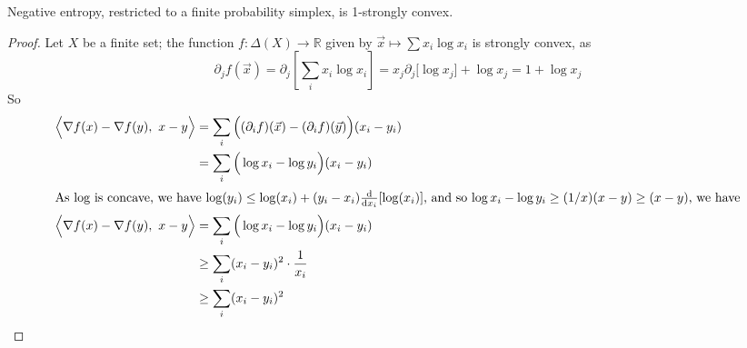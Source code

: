 {%
\begin{prop}\label{prop:neg-ent-convex}
  Negative entropy, restricted to a finite probability
			simplex, is 1-strongly convex. 
\end{prop}
\begin{proof}
	Let $X$ be a finite set; the function $f: \Delta(X) \to \mathbb R$ given by $\vec x \mapsto \sum x_i \log x_i$ is strongly convex, as 
	\begin{equation*}
		\partial_j f(\vec x) =  \partial_j\left[\sum_i x_i \log x_i \right] = 
			x_j \partial_j \big[\log x_j \big] + \log x_j = 1 + \log x_j
	\end{equation*}
	So
	\begin{align*}
		\Big\langle \nabla f(x) - \nabla f(y),~ x-y\Big\rangle 
			&= \sum_i \Big((\partial_i f)(\vec x) - (\partial_i f)(\vec y)\Big)(x_i - y_i) \\
			&= \sum_i \Big(\log x_i  - \log y_i \Big)(x_i - y_i) \\
		\intertext{As $\log$ is concave, we have $\log(y_i) \leq \log(x_i) + (y_i-x_i) \frac{\mathrm d}{\mathrm d x_i} [\log(x_i)]$, and so $\log x_i - \log y_i \geq (1/x) (x - y)  \geq (x-y)$, we have}
		\Big\langle \nabla f(x) - \nabla f(y),~ x-y\Big\rangle
			&= \sum_i \Big(\log x_i  - \log y_i \Big)(x_i - y_i) \\ %
			&\geq \sum_i (x_i-y_i)^2 \cdot \frac1{x_i}\\
			&\geq \sum_i (x_i-y_i)^2 \\

\end{align*}
\end{proof}}
